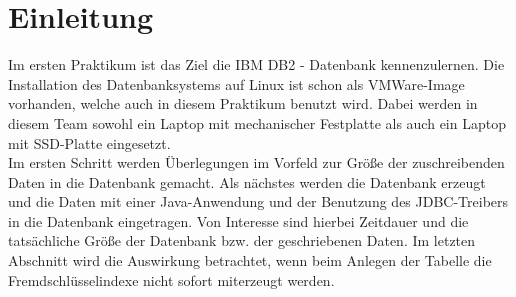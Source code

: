 \chapter{Einleitung}
Im ersten Praktikum ist das Ziel die IBM DB2 - Datenbank kennenzulernen. Die Installation des Datenbanksystems auf Linux ist schon als VMWare-Image vorhanden, welche auch in diesem Praktikum benutzt wird. Dabei werden in diesem Team sowohl ein Laptop mit mechanischer Festplatte als auch ein Laptop mit SSD-Platte eingesetzt.\\

Im ersten Schritt werden Überlegungen im Vorfeld zur Größe der zuschreibenden Daten in die Datenbank gemacht. Als nächstes werden die Datenbank erzeugt und die Daten mit einer Java-Anwendung und der Benutzung des JDBC-Treibers in die Datenbank eingetragen. Von Interesse sind hierbei Zeitdauer und die tatsächliche Größe der Datenbank bzw. der geschriebenen Daten. Im letzten Abschnitt wird die Auswirkung betrachtet, wenn beim Anlegen der Tabelle die Fremdschlüsselindexe nicht sofort miterzeugt werden.